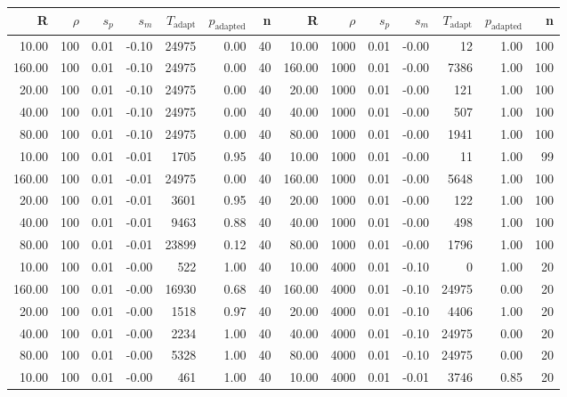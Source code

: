 \begin{table}[ht]
\centering
{\tiny
\begin{tabular}{|rrrrrrr||rrrrrrr|}
  \hline
R & $\rho$ & $s_p$ & $s_m$ & $T_\text{adapt}$ & $p_\text{adapted}$ & n & R & $\rho$ & $s_p$ & $s_m$ & $T_\text{adapt}$ & $p_\text{adapted}$ & n \\ 
  \hline
10.00 & 100 & 0.01 & -0.10 & 24975 & 0.00 & 40 & 10.00 & 1000 & 0.01 & -0.00 & 12 & 1.00 & 100 \\ 
  160.00 & 100 & 0.01 & -0.10 & 24975 & 0.00 & 40 & 160.00 & 1000 & 0.01 & -0.00 & 7386 & 1.00 & 100 \\ 
  20.00 & 100 & 0.01 & -0.10 & 24975 & 0.00 & 40 & 20.00 & 1000 & 0.01 & -0.00 & 121 & 1.00 & 100 \\ 
  40.00 & 100 & 0.01 & -0.10 & 24975 & 0.00 & 40 & 40.00 & 1000 & 0.01 & -0.00 & 507 & 1.00 & 100 \\ 
  80.00 & 100 & 0.01 & -0.10 & 24975 & 0.00 & 40 & 80.00 & 1000 & 0.01 & -0.00 & 1941 & 1.00 & 100 \\ 
  10.00 & 100 & 0.01 & -0.01 & 1705 & 0.95 & 40 & 10.00 & 1000 & 0.01 & -0.00 & 11 & 1.00 & 99 \\ 
  160.00 & 100 & 0.01 & -0.01 & 24975 & 0.00 & 40 & 160.00 & 1000 & 0.01 & -0.00 & 5648 & 1.00 & 100 \\ 
  20.00 & 100 & 0.01 & -0.01 & 3601 & 0.95 & 40 & 20.00 & 1000 & 0.01 & -0.00 & 122 & 1.00 & 100 \\ 
  40.00 & 100 & 0.01 & -0.01 & 9463 & 0.88 & 40 & 40.00 & 1000 & 0.01 & -0.00 & 498 & 1.00 & 100 \\ 
  80.00 & 100 & 0.01 & -0.01 & 23899 & 0.12 & 40 & 80.00 & 1000 & 0.01 & -0.00 & 1796 & 1.00 & 100 \\ 
  10.00 & 100 & 0.01 & -0.00 & 522 & 1.00 & 40 & 10.00 & 4000 & 0.01 & -0.10 & 0 & 1.00 & 20 \\ 
  160.00 & 100 & 0.01 & -0.00 & 16930 & 0.68 & 40 & 160.00 & 4000 & 0.01 & -0.10 & 24975 & 0.00 & 20 \\ 
  20.00 & 100 & 0.01 & -0.00 & 1518 & 0.97 & 40 & 20.00 & 4000 & 0.01 & -0.10 & 4406 & 1.00 & 20 \\ 
  40.00 & 100 & 0.01 & -0.00 & 2234 & 1.00 & 40 & 40.00 & 4000 & 0.01 & -0.10 & 24975 & 0.00 & 20 \\ 
  80.00 & 100 & 0.01 & -0.00 & 5328 & 1.00 & 40 & 80.00 & 4000 & 0.01 & -0.10 & 24975 & 0.00 & 20 \\ 
  10.00 & 100 & 0.01 & -0.00 & 461 & 1.00 & 40 & 10.00 & 4000 & 0.01 & -0.01 & 3746 & 0.85 & 20 \\ 

\end{tabular}}
\end{table}
